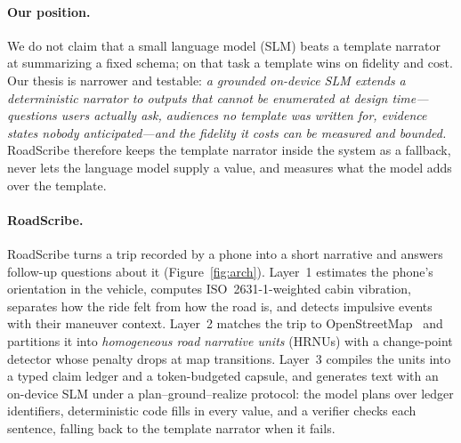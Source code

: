 \paragraph{Our position.}
We do not claim that a small language model (SLM) beats a template narrator at summarizing a fixed schema; on that task a template wins on fidelity and cost.
Our thesis is narrower and testable: \emph{a grounded on-device SLM extends a deterministic narrator to outputs that cannot be enumerated at design time---questions users actually ask, audiences no template was written for, evidence states nobody anticipated---and the fidelity it costs can be measured and bounded.}
RoadScribe therefore keeps the template narrator inside the system as a fallback, never lets the language model supply a value, and measures what the model adds over the template.

\paragraph{RoadScribe.}
RoadScribe turns a trip recorded by a phone into a short narrative and answers follow-up questions about it (Figure~\ref{fig:arch}).
Layer~1 estimates the phone's orientation in the vehicle, computes ISO~2631-1-weighted cabin vibration, separates how the ride felt from how the road is, and detects impulsive events with their maneuver context.
Layer~2 matches the trip to OpenStreetMap~\cite{haklay2008osm} and partitions it into \emph{homogeneous road narrative units} (HRNUs) with a change-point detector whose penalty drops at map transitions.
Layer~3 compiles the units into a typed claim ledger and a token-budgeted capsule, and generates text with an on-device SLM under a plan--ground--realize protocol: the model plans over ledger identifiers, deterministic code fills in every value, and a verifier checks each sentence, falling back to the template narrator when it fails.

